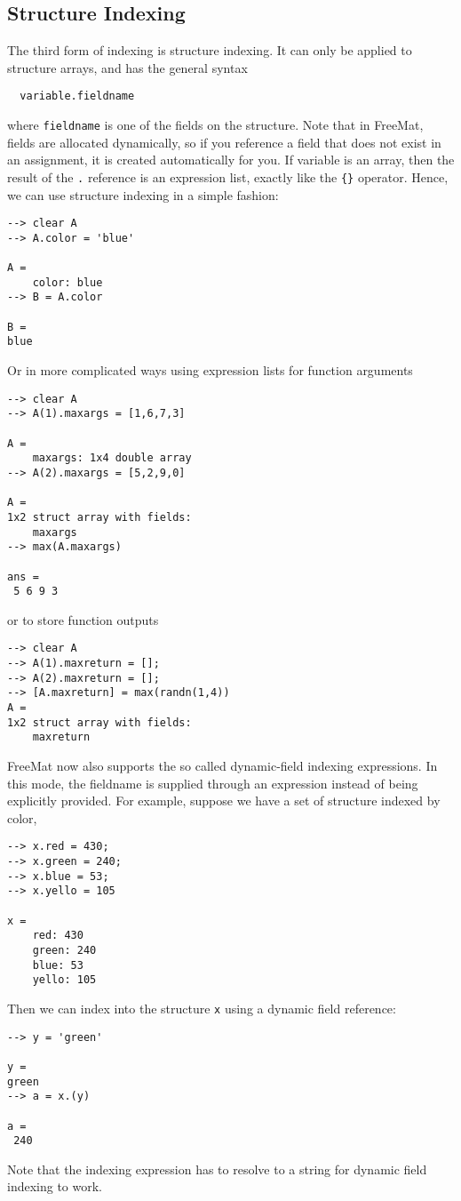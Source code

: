 \subsection{Structure Indexing}

The third form of indexing is structure indexing.  It can only
be applied to structure arrays, and has the general syntax
\begin{verbatim}
  variable.fieldname
\end{verbatim}
where \verb|fieldname| is one of the fields on the structure.  Note that
in FreeMat, fields are allocated dynamically, so if you reference
a field that does not exist in an assignment, it is created automatically
for you.  If variable is an array, then the result of the \verb|.| 
reference is an expression list, exactly like the \verb|{}| operator.  Hence,
we can use structure indexing in a simple fashion:
\begin{verbatim}
--> clear A
--> A.color = 'blue'

A = 
    color: blue
--> B = A.color

B = 
blue
\end{verbatim}
Or in more complicated ways using expression lists for function arguments
\begin{verbatim}
--> clear A
--> A(1).maxargs = [1,6,7,3]

A = 
    maxargs: 1x4 double array
--> A(2).maxargs = [5,2,9,0]

A = 
1x2 struct array with fields:
    maxargs
--> max(A.maxargs)

ans = 
 5 6 9 3 
\end{verbatim}
or to store function outputs
\begin{verbatim}
--> clear A
--> A(1).maxreturn = [];
--> A(2).maxreturn = [];
--> [A.maxreturn] = max(randn(1,4))
A = 
1x2 struct array with fields:
    maxreturn
\end{verbatim}
FreeMat now also supports the so called dynamic-field indexing 
expressions.  In this mode, the fieldname is supplied through 
an expression instead of being explicitly provided.  For example,
suppose we have a set of structure indexed by color,
\begin{verbatim}
--> x.red = 430;
--> x.green = 240;
--> x.blue = 53;
--> x.yello = 105

x = 
    red: 430
    green: 240
    blue: 53
    yello: 105
\end{verbatim}
Then we can index into the structure \verb|x| using a dynamic field
reference:
\begin{verbatim}
--> y = 'green'

y = 
green
--> a = x.(y)

a = 
 240 
\end{verbatim}
Note that the indexing expression has to resolve to a string for
dynamic field indexing to work.

